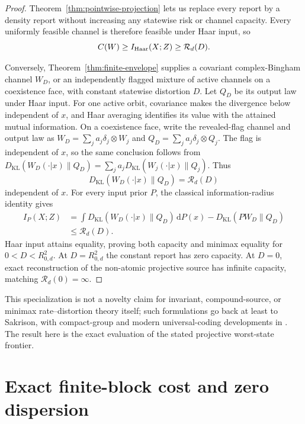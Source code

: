 \documentclass[11pt,a4paper]{article}
\theoremstyle{remark}
\newcommand{\cR}{\mathcal{R}}
\newcommand{\KL}{D_{\mathrm{KL}}}
\newcommand{\dd}{\,\mathrm{d}}
\begin{document}
\begin{proof}
Theorem~\ref{thm:pointwise-projection} lets us replace every report by a
density report without increasing any statewise risk or channel capacity.
Every uniformly feasible channel is therefore feasible under Haar input, so
\begin{equation}
 C(W)\ge I_{\rm Haar}(X;Z)\ge\cR_d(D).
\end{equation}

Conversely, Theorem~\ref{thm:finite-envelope} supplies a covariant
complex-Bingham channel $W_D$, or an independently flagged mixture of active
channels on a coexistence face, with constant statewise distortion $D$.
Let $Q_D$ be its output law under Haar input.  For one active orbit,
covariance makes the divergence below independent of $x$, and Haar averaging
identifies its value with the attained mutual information.  On a coexistence
face, write the revealed-flag channel and output law as
$W_D=\sum_j a_j\delta_j\otimes W_j$ and
$Q_D=\sum_j a_j\delta_j\otimes Q_j$.  The flag is independent of $x$, so the
same conclusion follows from
$\KL(W_D(\cdot|x)\|Q_D)=\sum_j a_j\KL(W_j(\cdot|x)\|Q_j)$.  Thus
\begin{equation}
 \KL(W_D(\cdot|x)\|Q_D)=\cR_d(D)
 \label{eq:constant-divergence}
\end{equation}
independent of $x$.  For every input prior $P$, the classical
information-radius identity \cite{CsiszarShields2004} gives
\begin{align}
 I_P(X;Z)
 &=\int\KL(W_D(\cdot|x)\|Q_D)\dd P(x)
   -\KL(PW_D\|Q_D)\\
 &\le\cR_d(D).
\end{align}
Haar input attains equality, proving both capacity and minimax equality for
$0<D<R_{0,d}^2$.  At $D=R_{0,d}^2$ the constant report has zero capacity.
At $D=0$, exact reconstruction of the non-atomic projective source has
infinite capacity, matching $\cR_d(0)=\infty$.
\end{proof}

This specialization is not a novelty claim for invariant, compound-source, or
minimax rate--distortion theory itself; such formulations go back at least to
Sakrison, with compact-group and modern universal-coding developments in
\cite{Sakrison1969,Harremoes2009CompactGroups,MahmoodWagner2022}.  The result
here is the exact evaluation of the stated projective worst-state frontier.

\section{Exact finite-block cost and zero dispersion}
\end{document}
